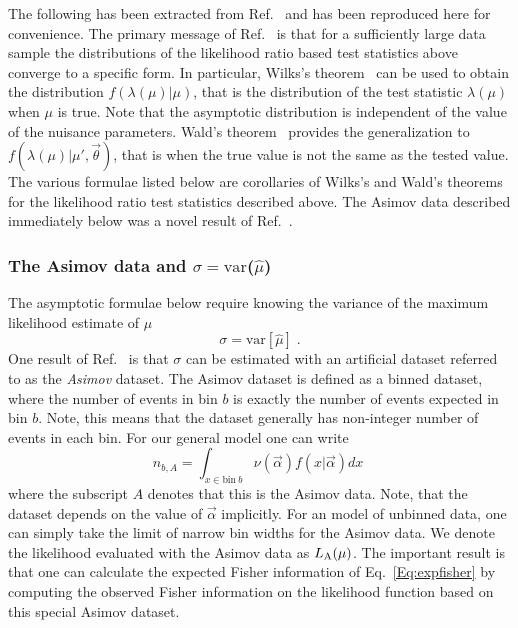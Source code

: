 The following has been extracted from Ref.~\cite{asimov} and has been reproduced here for convenience.  The primary message of Ref.~\cite{asimov} is that for a sufficiently large data sample the distributions of the likelihood ratio based test statistics above converge to a specific form.  In particular, Wilks's theorem~\cite{Wilks} can be used to obtain the distribution $f(\lambda(\mu)|\mu)$, that is the distribution of the test statistic $\lambda(\mu)$ when $\mu$ is true.  Note that the asymptotic distribution is independent of the value of the nuisance parameters. Wald's theorem~\cite{Wald} provides the generalization to $f(\lambda(\mu)|\mu',\vec\theta)$, that is when the true value is not the same as the tested value.  The various formulae listed below are corollaries of Wilks's and Wald's theorems for the likelihood ratio test statistics described above.  The Asimov data described immediately below was a novel result of Ref.~\cite{asimov}.


\subsubsection{The Asimov data and  $\sigma=\textrm{var}$($\hat\mu$)}
\label{S:Asimov} 

The asymptotic formulae below require knowing the variance of the maximum likelihood estimate of $\mu$
\begin{equation}
 \sigma=\textrm{var}[\hat\mu]\;.
 \end{equation}
One result of Ref.~\cite{asimov} is that $\sigma$ can be
estimated with an artificial dataset referred to as the \textit{ Asimov} dataset.  The Asimov dataset is defined as a binned dataset, where the number of events in bin $b$ is exactly the number of events expected in bin $b$.  Note, this means that the dataset generally has non-integer number of events in each bin.  For our general model one can write
\begin{equation}
\label{eq:asimovData}
n_{b,A} = \int_{x \in \textrm{bin}~b} \nu(\vec\alpha) f(x|\vec\alpha) dx \;
\end{equation}
where the subscript $A$ denotes that this is the Asimov data.  Note, that the dataset depends on the value of $\vec\alpha$ implicitly.  For an model of unbinned data, one can simply take the limit of narrow bin widths for the Asimov data.    We denote the likelihood evaluated with the Asimov data as $L_{\rm A}(\mu)$. 
The important result is that one can calculate the expected Fisher information of Eq.~\ref{Eq:expfisher} by computing the observed Fisher information on the likelihood function based on this special Asimov dataset.  


